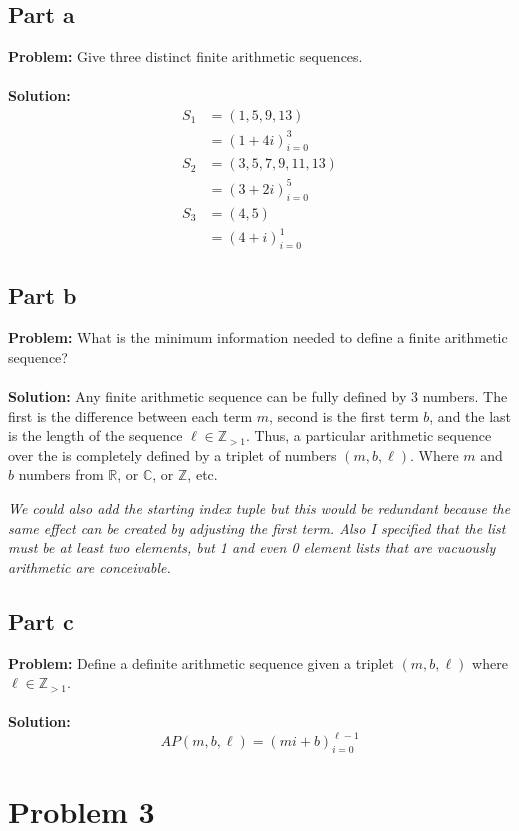 \documentclass{article}
\begin{document}
\subsection{Part a}
\textbf{Problem:} Give three distinct finite arithmetic sequences.
\\\\
\textbf{Solution:}
\begin{align*}
  S_1&=(1,5,9,13)\\
  &=(1+4i)_{i=0}^{3}\\
  S_2&=(3,5,7,9,11,13)\\
  &=(3+2i)_{i=0}^{5}\\
  S_3&=(4,5)\\
  &=(4+i)_{i=0}^{1}
\end{align*}

\subsection{Part b}
\textbf{Problem:} What is the minimum information needed to define a finite arithmetic sequence?
\\\\
\textbf{Solution:} Any finite arithmetic sequence can be fully defined by 3 numbers. The first is the difference between each term $m$, second is the first term $b$, and the last is the length of the sequence $\ell\in\mathbb Z_{>1}$. Thus, a particular arithmetic sequence over the is completely defined by a triplet of numbers $(m,b,\ell)$. Where $m$ and $b$ numbers from $\mathbb R$, or $\mathbb C$, or $\mathbb Z$, etc.

\textit{We could also add the starting index tuple but this would be redundant because the same effect can be created by adjusting the first term. Also I specified that the list must be at least two elements, but 1 and even 0 element lists that are vacuously arithmetic are conceivable.}

\subsection{Part c}
\textbf{Problem:} Define a definite arithmetic sequence given a triplet $(m,b,\ell)$ where $\ell\in\mathbb Z_{>1}$.
\\\\
\textbf{Solution:}
$$AP(m,b,\ell)=(mi+b)_{i=0}^{\ell-1}$$

\section{Problem 3}
\end{document}

